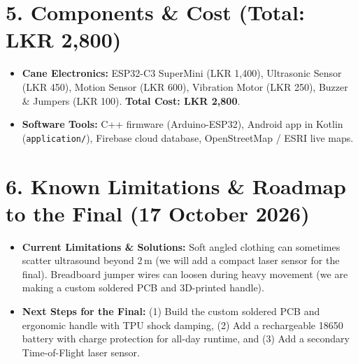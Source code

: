 \documentclass[10pt,a4paper]{article}
\begin{document}
\section{5. Components \& Cost (Total: LKR 2,800)}
\begin{itemize}
    \item \textbf{Cane Electronics:} ESP32-C3 SuperMini (LKR 1,400), Ultrasonic Sensor (LKR 450), Motion Sensor (LKR 600), Vibration Motor (LKR 250), Buzzer \& Jumpers (LKR 100). \textbf{Total Cost: LKR 2,800}.
    \item \textbf{Software Tools:} C++ firmware (Arduino-ESP32), Android app in Kotlin (\texttt{application/}), Firebase cloud database, OpenStreetMap / ESRI live maps.
\end{itemize}

\section{6. Known Limitations \& Roadmap to the Final (17 October 2026)}
\begin{itemize}
    \item \textbf{Current Limitations \& Solutions:} Soft angled clothing can sometimes scatter ultrasound beyond 2\,m (we will add a compact laser sensor for the final). Breadboard jumper wires can loosen during heavy movement (we are making a custom soldered PCB and 3D-printed handle).
    \item \textbf{Next Steps for the Final:} (1) Build the custom soldered PCB and ergonomic handle with TPU shock damping, (2) Add a rechargeable 18650 battery with charge protection for all-day runtime, and (3) Add a secondary Time-of-Flight laser sensor.
\end{itemize}
\end{document}
